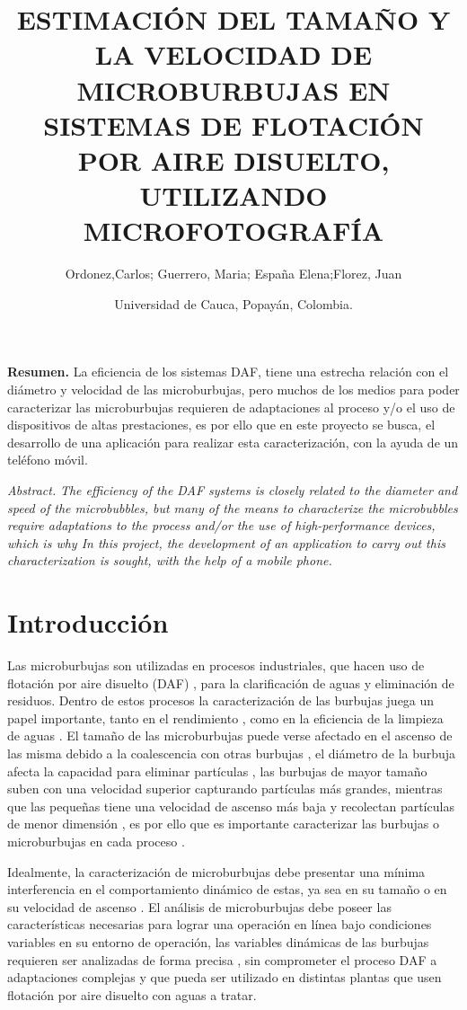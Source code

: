 \documentclass[12pt,twocolumn,a4paper]{article}
\title{ESTIMACIÓN DEL TAMAÑO Y LA VELOCIDAD DE
MICROBURBUJAS EN SISTEMAS DE FLOTACIÓN POR
AIRE DISUELTO, UTILIZANDO MICROFOTOGRAFÍA}
\author{Ordonez,Carlos;  Guerrero, Maria; España Elena;Florez, Juan 
 \\ 
\and{Universidad de Cauca, Popayán, Colombia.}\\
}
\begin{document}
\maketitle
\textbf{Resumen.}
La eficiencia de los sistemas DAF, tiene una estrecha relación con el diámetro y velocidad de las microburbujas, pero muchos de los medios para poder caracterizar las microburbujas requieren de adaptaciones al proceso y/o el uso de dispositivos de altas prestaciones, es por ello que en este proyecto se busca, el desarrollo de una aplicación para realizar esta caracterización, con la ayuda de un teléfono móvil. 

\textit{Abstract.}  
\textit{The efficiency of the DAF systems is closely related to the diameter and speed of the microbubbles, but many of the means to characterize the microbubbles require adaptations to the process and/or the use of high-performance devices, which is why In this project, the development of an application to carry out this characterization is sought, with the help of a mobile phone.}

\section{Introducción}

Las microburbujas son utilizadas en procesos industriales, que hacen uso de flotación por aire disuelto (DAF) \cite{cheng2016bubble}, para la clarificación de aguas y eliminación de residuos. Dentro de estos procesos la caracterización de las burbujas juega un papel importante, tanto en el rendimiento \cite{gulden2018online} \cite{eskanlou2018interactional} \cite{reis2016study}, como en la eficiencia de la limpieza de aguas \cite{sadeghi2020experimental} \cite{fanaie2020effect}. El tamaño de las microburbujas puede verse afectado en el ascenso de las misma debido a la coalescencia con otras burbujas \cite{fanaie2020effect}, el diámetro de la burbuja afecta la capacidad para eliminar partículas \cite{sadeghi2020experimental}, las burbujas de mayor tamaño suben con una velocidad superior capturando partículas más grandes, mientras que las pequeñas tiene una velocidad de ascenso más baja y recolectan partículas de menor dimensión \cite{sadeghi2020experimental} \cite{brasileiro2020construction}, es por ello que es importante caracterizar las burbujas o microburbujas en cada proceso \cite{sadeghi2020experimental} \cite{ahmadi2014nano}.


Idealmente, la caracterización de microburbujas debe presentar una mínima interferencia en el comportamiento dinámico de estas, ya sea en su tamaño o en su velocidad de ascenso \cite{gulden2018online}. El análisis de microburbujas debe poseer las características necesarias para lograr una operación en línea  bajo condiciones variables en su entorno de operación, las variables dinámicas de las burbujas requieren ser analizadas de forma precisa \cite{parmar2015terminal}, sin comprometer el proceso DAF a adaptaciones complejas y que pueda ser utilizado en distintas plantas que usen flotación por aire disuelto con aguas a tratar.
\end{document}
